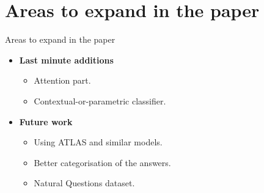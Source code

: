 \documentclass[9pt]{beamer}
\begin{document}
\section{Areas to expand in the paper}
\begin{frame}{Areas to expand in the paper}
	\begin{itemize}
		\item \textbf{Last minute additions}
			\begin{itemize}
				\item Attention part.
				\item Contextual-or-parametric classifier.
			\end{itemize}
		\item \textbf{Future work}
			\begin{itemize}
				\item Using ATLAS and similar models.
				\item Better categorisation of the answers.
				\item Natural Questions dataset.
			\end{itemize}
	\end{itemize}
\end{frame}
\end{document}
